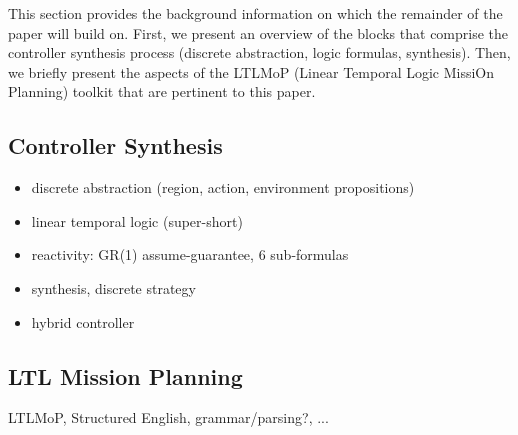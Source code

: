 This section provides the background information on which the remainder of the paper will build on. First, we present an overview of the blocks that comprise the controller synthesis process (discrete abstraction, logic formulas, synthesis). Then, we briefly present the aspects of the LTLMoP (Linear Temporal Logic MissiOn Planning) toolkit that are pertinent to this paper.

\subsection{Controller Synthesis}

\begin{itemize}
	\item discrete abstraction (region, action, environment propositions)
	\item linear temporal logic (super-short)
	\item reactivity: GR(1) assume-guarantee, 6 sub-formulas
	\item synthesis, discrete strategy
	\item hybrid controller
\end{itemize}

\subsection{LTL Mission Planning}

LTLMoP, Structured English, grammar/parsing?, ...